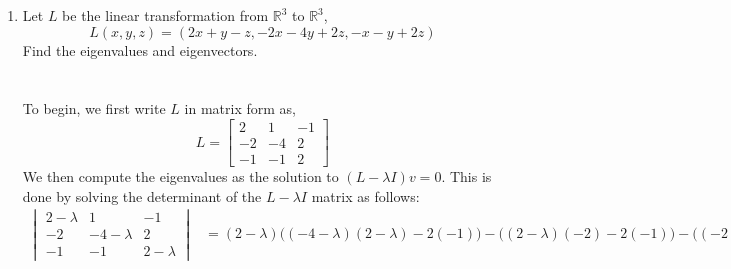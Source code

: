 \documentclass[letterpaper,10pt]{article}
\newcommand{\R}{\mathbb{R}}
\begin{document}
\begin{enumerate}
\begin{enumerate}
\begin{align*}
\begin{bmatrix}
0 & 0 & 1
\end{bmatrix} && R_1=R_1-R_3,\ R_2=R_2-R_3,\ R_2=\frac{R_2}{2}
\end{align*}
So, we see that for all values of $a\neq 4$, $U$ spans $\R^3$, as it reduces to the trivial basis.
\item We now consider the case of $a=4$. In this case, we return to the calculations from before, and evaluate,
\begin{align*}
\begin{bmatrix}
1 & 0 & 1\\
0 & 2 & -4\\
0 & 2 & -a
\end{bmatrix} &= \begin{bmatrix}
1 & 0 & 1\\
0 & 2 & -4\\
0 & 2 & -4
\end{bmatrix}\\
&=\begin{bmatrix}
1 & 0 & 1\\
0 & 1 & -2\\
0 & 0 & 0
\end{bmatrix} && R_3=R_3-R_2,\ R_2=\frac{R_2}{2}
\end{align*}
From here, we see that $U$ is the span of only two vectors, $U=\text{span}\{<1,0,1>,<0,1,-2>\}$
\item From here, we see that the dimension of $U$ is two.
\end{enumerate}
\newpage
\item Let $L$ be the linear transformation from $\R^3$ to $\R^3$,
\[L(x,y,z)=(2x+y-z,-2x-4y+2z,-x-y+2z)\]
Find the eigenvalues and eigenvectors.\\\\\\
To begin, we first write $L$ in matrix form as,
\[L=\begin{bmatrix}
2 & 1 & -1\\
-2 & -4 & 2\\
-1 & -1 & 2
\end{bmatrix} \]
We then compute the eigenvalues as the solution to $(L-\lambda I)v=0$. This is done by solving the determinant of the $L-\lambda I$ matrix as follows:
\begin{align*}
\begin{vmatrix}
2-\lambda & 1 & -1\\
-2 & -4-\lambda & 2\\
-1 & -1 & 2-\lambda
\end{vmatrix} &= (2-\lambda)\big((-4-\lambda)(2-\lambda)-2(-1)\big)-\big((2-\lambda)(-2)-2(-1)\big)-\big((-2)(-1)-(-1)(-4-\lambda)\big)\\

\end{align*}
\end{enumerate}
\end{document}
